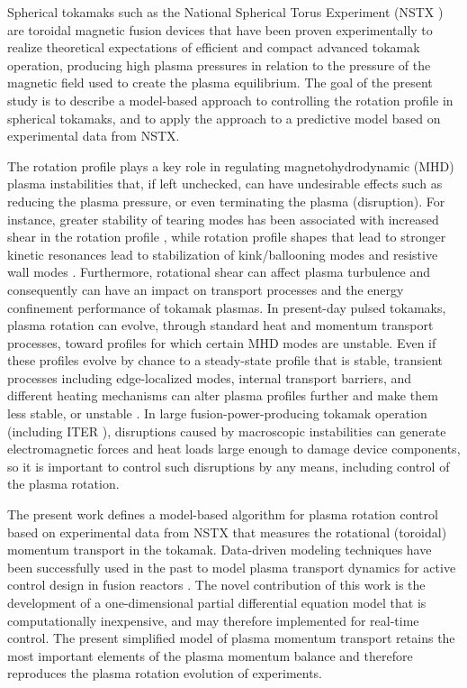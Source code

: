 \documentclass[12pt]{iopart}
\begin{document}
Spherical tokamaks such as the National Spherical Torus Experiment (NSTX
\cite{Ono00}) are toroidal magnetic fusion devices that have been proven
experimentally to realize theoretical expectations of efficient and compact
advanced tokamak operation, producing high plasma pressures in relation to the
pressure of the magnetic field used to create the plasma equilibrium. The goal
of the present study is to describe a model-based approach to controlling the
rotation profile in spherical tokamaks, and to apply the approach to a
predictive model based on experimental data from NSTX.

The rotation profile plays a key role in regulating magnetohydrodynamic (MHD)
plasma instabilities that, if left unchecked, can have undesirable effects such
as reducing the plasma pressure, or even terminating the plasma (disruption).
For instance, greater stability of tearing modes has been associated with
increased shear in the rotation profile \cite{Gerhardt09, Park13}, while
rotation profile shapes that lead to stronger kinetic resonances lead to
stabilization of kink/ballooning modes and resistive wall modes \cite{Sabbagh10,
  Berkery10}. Furthermore, rotational shear can affect plasma turbulence and
consequently can have an impact on transport processes and the energy
confinement performance of tokamak plasmas. In present-day pulsed tokamaks,
plasma rotation can evolve, through standard heat and momentum transport
processes, toward profiles for which certain MHD modes are unstable.
%
Even if these profiles evolve by chance to a steady-state profile that is
stable, transient processes including edge-localized modes, internal transport
barriers, and different heating mechanisms can alter plasma profiles further and make
them less stable, or unstable \cite{Sabbagh13}.
%
In large fusion-power-producing tokamak operation (including ITER
\cite{Hender07}), disruptions caused by macroscopic instabilities can generate
electromagnetic forces and heat loads large enough to damage device components,
so it is important to control such disruptions by any means, including control
of the plasma rotation.

The present work defines a model-based algorithm for plasma rotation control
based on experimental data from NSTX \cite{Ono00} that measures the rotational
(toroidal) momentum transport in the tokamak. Data-driven modeling techniques
have been successfully used in the past to model plasma transport dynamics for
active control design in fusion reactors \cite{Moreau13, Boyer133, Boyer144,
  Barton12}. The novel contribution of this work is the development of a
one-dimensional partial differential equation model that is computationally
inexpensive, and may therefore implemented for real-time control.  
The present simplified model of plasma momentum transport retains the most important elements of the plasma momentum balance and therefore reproduces the plasma rotation evolution of experiments.
 
\end{document}
